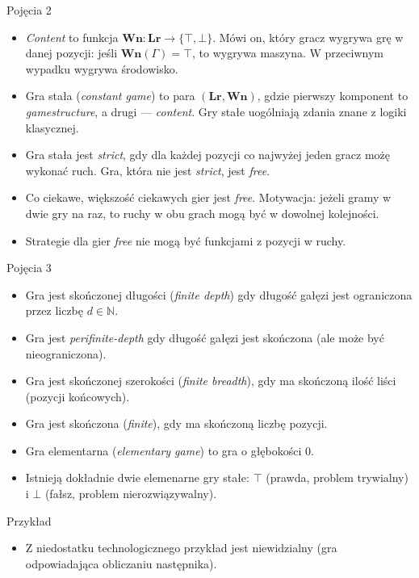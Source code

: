 \documentclass{beamer}
\begin{document}
\begin{frame}{Pojęcia 2}
\begin{itemize}
	\item \textit{Content} to funkcja $\textbf{Wn}: \textbf{Lr} \to \{\top, \bot\}$. Mówi on, który gracz wygrywa grę w danej pozycji: jeśli $\textbf{Wn}(\Gamma) = \top$, to wygrywa maszyna. W przeciwnym wypadku wygrywa środowisko.
	\item Gra stała (\textit{constant game}) to para $(\textbf{Lr}, \textbf{Wn})$, gdzie pierwszy komponent to \textit{gamestructure}, a drugi — \textit{content}. Gry stałe uogólniają zdania znane z logiki klasycznej.
	\item Gra stała jest \textit{strict}, gdy dla każdej pozycji co najwyżej jeden gracz możę wykonać ruch. Gra, która nie jest \textit{strict}, jest \textit{free}.
	\item Co ciekawe, większość ciekawych gier jest \textit{free}. Motywacja: jeżeli gramy w dwie gry na raz, to ruchy w obu grach mogą być w dowolnej kolejności.
	\item Strategie dla gier \textit{free} nie mogą być funkcjami z pozycji w ruchy.
\end{itemize}
\end{frame}

\begin{frame}{Pojęcia 3}
\begin{itemize}
	\item Gra jest skończonej długości (\textit{finite depth}) gdy długość gałęzi jest ograniczona przez liczbę $d \in \mathbb{N}$.
	\item Gra jest \textit{perifinite-depth} gdy długość gałęzi jest skończona (ale może być nieograniczona).
	\item Gra jest skończonej szerokości (\textit{finite breadth}), gdy ma skończoną ilość liści (pozycji końcowych).
	\item Gra jest skończona (\textit{finite}), gdy ma skończoną liczbę pozycji.
	\item Gra elementarna (\textit{elementary game}) to gra o głębokości 0.
	\item Istnieją dokładnie dwie elemenarne gry stałe: $\top$ (prawda, problem trywialny) i $\bot$ (fałsz, problem nierozwiązywalny).
\end{itemize}
\end{frame}

\begin{frame}{Przykład}
\begin{itemize}
	\item Z niedostatku technologicznego przykład jest niewidzialny (gra odpowiadająca obliczaniu następnika).
\end{itemize}
\end{frame}
\end{document}
